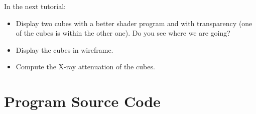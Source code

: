 \documentclass[11pt,oneside,a4paper,final]{article}
\begin{document}
In the next tutorial:
\begin{itemize}
	\item Display two cubes with a better shader program and with transparency (one of the cubes is within the other one). 
	Do you see where we are going?
	
	\item Display the cubes in wireframe.
	
	\item Compute the X-ray attenuation of the cubes.
\end{itemize}




\appendix
\section{Program Source Code}
\label{sec:Program Source Code}

\begin{center}
  
\end{center}

% 
% 
\end{document}
